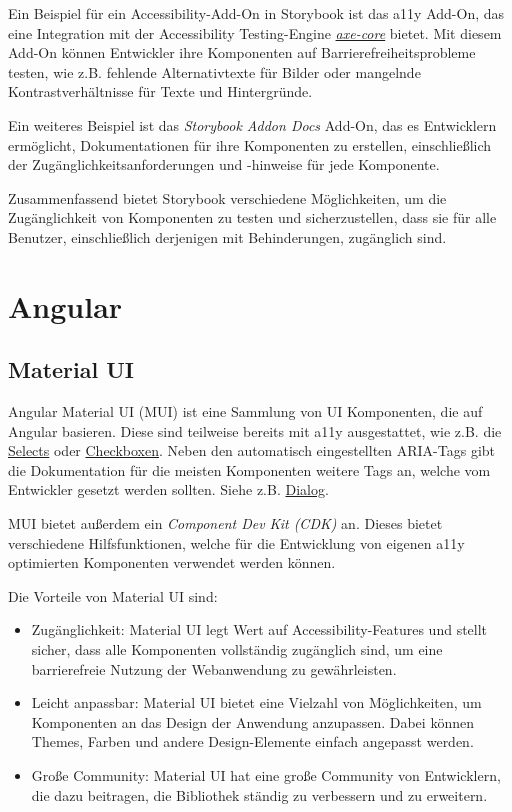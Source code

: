 Ein Beispiel für ein Accessibility-Add-On in Storybook ist das a11y Add-On, das eine Integration mit der Accessibility Testing-Engine \hyperref[sec:a11yToolsAxe]{\emph{axe-core}} bietet. Mit diesem Add-On können Entwickler ihre Komponenten auf Barrierefreiheitsprobleme testen, wie z.B. fehlende Alternativtexte für Bilder oder mangelnde Kontrastverhältnisse für Texte und Hintergründe.

Ein weiteres Beispiel ist das \emph{Storybook Addon Docs} Add-On, das es Entwicklern ermöglicht, Dokumentationen für ihre Komponenten zu erstellen, einschließlich der Zugänglichkeitsanforderungen und -hinweise für jede Komponente.

Zusammenfassend bietet Storybook verschiedene Möglichkeiten, um die Zugänglichkeit von Komponenten zu testen und sicherzustellen, dass sie für alle Benutzer, einschließlich derjenigen mit Behinderungen, zugänglich sind.

\section{Angular}

\subsection{Material UI}

Angular Material UI (MUI) ist eine Sammlung von UI Komponenten, die auf Angular basieren. \cite{angular_components_team_angular_nodate} Diese sind teilweise bereits mit a11y ausgestattet, wie z.B. die \href{https://material.angular.io/components/select/overview#accessibility}{Selects} oder \href{https://material.angular.io/components/checkbox/overview#accessibility}{Checkboxen}. Neben den automatisch eingestellten ARIA-Tags gibt die Dokumentation für die meisten Komponenten weitere Tags an, welche vom Entwickler gesetzt werden sollten. Siehe z.B. \href{https://material.angular.io/components/dialog/overview#accessibility}{Dialog}.

MUI bietet außerdem ein \emph{Component Dev Kit (CDK)} an. Dieses bietet verschiedene Hilfsfunktionen, welche für die Entwicklung von eigenen a11y optimierten Komponenten verwendet werden können. \cite{angular_components_team_angular_nodate}

Die Vorteile von Material UI sind:

\begin{itemize}
    \item Zugänglichkeit: Material UI legt Wert auf Accessibility-Features und stellt sicher, dass alle Komponenten vollständig zugänglich sind, um eine barrierefreie Nutzung der Webanwendung zu gewährleisten.
    \item Leicht anpassbar: Material UI bietet eine Vielzahl von Möglichkeiten, um Komponenten an das Design der Anwendung anzupassen. Dabei können Themes, Farben und andere Design-Elemente einfach angepasst werden.
    \item Große Community: Material UI hat eine große Community von Entwicklern, die dazu beitragen, die Bibliothek ständig zu verbessern und zu erweitern.
\end{itemize}

